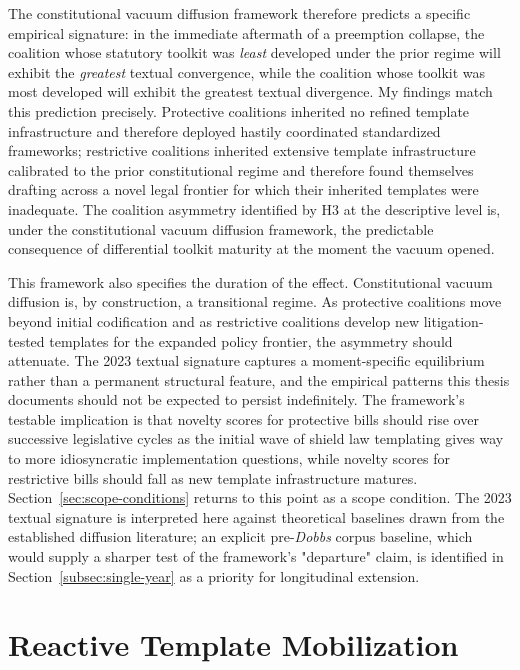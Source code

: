 The constitutional vacuum diffusion framework therefore predicts a specific empirical signature: in the immediate aftermath of a preemption collapse, the coalition whose statutory toolkit was \emph{least} developed under the prior regime will exhibit the \emph{greatest} textual convergence, while the coalition whose toolkit was most developed will exhibit the greatest textual divergence. My findings match this prediction precisely. Protective coalitions inherited no refined template infrastructure and therefore deployed hastily coordinated standardized frameworks; restrictive coalitions inherited extensive template infrastructure calibrated to the prior constitutional regime and therefore found themselves drafting across a novel legal frontier for which their inherited templates were inadequate. The coalition asymmetry identified by H3 at the descriptive level is, under the constitutional vacuum diffusion framework, the predictable consequence of differential toolkit maturity at the moment the vacuum opened.

This framework also specifies the duration of the effect. Constitutional vacuum diffusion is, by construction, a transitional regime. As protective coalitions move beyond initial codification and as restrictive coalitions develop new litigation-tested templates for the expanded policy frontier, the asymmetry should attenuate. The 2023 textual signature captures a moment-specific equilibrium rather than a permanent structural feature, and the empirical patterns this thesis documents should not be expected to persist indefinitely. The framework's testable implication is that novelty scores for protective bills should rise over successive legislative cycles as the initial wave of shield law templating gives way to more idiosyncratic implementation questions, while novelty scores for restrictive bills should fall as new template infrastructure matures. Section~\ref{sec:scope-conditions} returns to this point as a scope condition. The 2023 textual signature is interpreted here against theoretical baselines drawn from the established diffusion literature; an explicit pre-\textit{Dobbs} corpus baseline, which would supply a sharper test of the framework's "departure" claim, is identified in Section~\ref{subsec:single-year} as a priority for longitudinal extension.

\section{Reactive Template Mobilization}
\label{sec:rtm}

